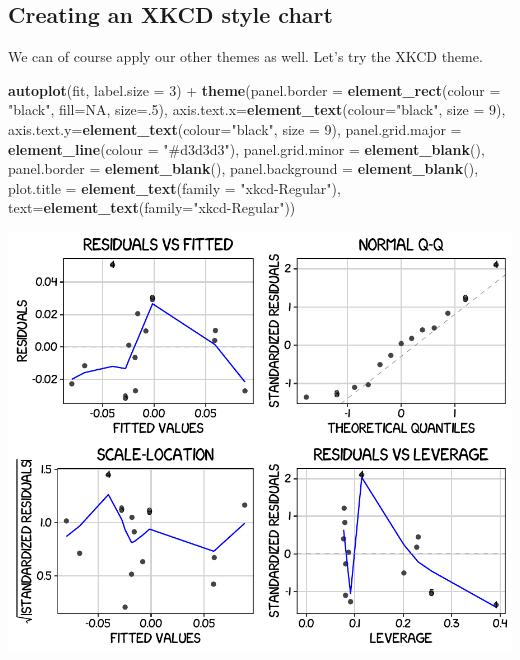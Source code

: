 \documentclass[]{article}
\newenvironment{Shaded}{\begin{snugshade}}{\end{snugshade}}
\newcommand{\KeywordTok}[1]{\textcolor[rgb]{0.13,0.29,0.53}{\textbf{{#1}}}}
\newcommand{\DataTypeTok}[1]{\textcolor[rgb]{0.13,0.29,0.53}{{#1}}}
\newcommand{\DecValTok}[1]{\textcolor[rgb]{0.00,0.00,0.81}{{#1}}}
\newcommand{\StringTok}[1]{\textcolor[rgb]{0.31,0.60,0.02}{{#1}}}
\newcommand{\OtherTok}[1]{\textcolor[rgb]{0.56,0.35,0.01}{{#1}}}
\newcommand{\NormalTok}[1]{{#1}}
\begin{document}
\subsection{Creating an XKCD style
chart}\label{creating-an-xkcd-style-chart-1}

We can of course apply our other themes as well. Let's try the XKCD
theme.

\begin{Shaded}
\begin{Highlighting}[]
\KeywordTok{autoplot}\NormalTok{(fit, }\DataTypeTok{label.size =} \DecValTok{3}\NormalTok{) +}\StringTok{ }\KeywordTok{theme}\NormalTok{(}\DataTypeTok{panel.border =} \KeywordTok{element_rect}\NormalTok{(}\DataTypeTok{colour =} \StringTok{"black"}\NormalTok{, }\DataTypeTok{fill=}\OtherTok{NA}\NormalTok{, }\DataTypeTok{size=}\NormalTok{.}\DecValTok{5}\NormalTok{),}
    \DataTypeTok{axis.text.x=}\KeywordTok{element_text}\NormalTok{(}\DataTypeTok{colour=}\StringTok{"black"}\NormalTok{, }\DataTypeTok{size =} \DecValTok{9}\NormalTok{), }
    \DataTypeTok{axis.text.y=}\KeywordTok{element_text}\NormalTok{(}\DataTypeTok{colour=}\StringTok{"black"}\NormalTok{, }\DataTypeTok{size =} \DecValTok{9}\NormalTok{),}
    \DataTypeTok{panel.grid.major =} \KeywordTok{element_line}\NormalTok{(}\DataTypeTok{colour =} \StringTok{"#d3d3d3"}\NormalTok{), }
    \DataTypeTok{panel.grid.minor =} \KeywordTok{element_blank}\NormalTok{(), }
    \DataTypeTok{panel.border =} \KeywordTok{element_blank}\NormalTok{(), }\DataTypeTok{panel.background =} \KeywordTok{element_blank}\NormalTok{(),}
    \DataTypeTok{plot.title =} \KeywordTok{element_text}\NormalTok{(}\DataTypeTok{family =} \StringTok{"xkcd-Regular"}\NormalTok{),}
    \DataTypeTok{text=}\KeywordTok{element_text}\NormalTok{(}\DataTypeTok{family=}\StringTok{"xkcd-Regular"}\NormalTok{))}
\end{Highlighting}
\end{Shaded}

\begin{center}\includegraphics{11_Linear_Regression_Plot_pdf/lr_21-1} \end{center}
\end{document}
